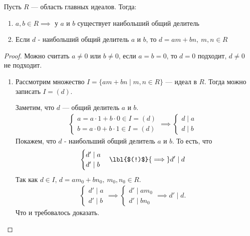 \begin{theorem-non}
    Пусть $R$ --- область главных идеалов. Тогда:

    \begin{enumerate}
        \item $a, b \in R \implies$ у $a$ и $b$ существует наибольший общий делитель
        
        \item Если $d$ - наибольший общий делитель $a$ и $b$, то $d = am + bn,~m, n \in R$
    \end{enumerate}
\end{theorem-non}

\begin{proof}
    
    Можно считать $a \neq 0$ или $b \neq 0$, если $a = b = 0$, то $d = 0$ подходит, $d \neq 0$ не подходит.

    \begin{enumerate}
        \item Рассмотрим множество $I = \{ am + bn \mid m, n \in R \}$ --- идеал в $R$. Тогда можно записать $I = (d)$. 
        
        Заметим, что $d$ --- общий делитель $a$ и $b$. 
        \begin{gather*}
            \begin{cases}
                a = a \cdot 1 + b \cdot 0 \in I = (d)\\
                b = a \cdot 0 + b \cdot 1 \in I = (d)
            \end{cases} \implies \begin{cases}
                d \mid a\\
                d \mid b
            \end{cases}
        \end{gather*}
        Покажем, что $d$ - наибольший общий делитель $a$ и $b$.
        То есть, что 
        \begin{gather*}
            \begin{cases}
                d' \mid a\\
                d' \mid b
            \end{cases} \lbl{$(!)$}{\implies} d' \mid d
        \end{gather*}
        Так как $d \in I$, $d = a m_0 + b n_0,~m_0, n_0 \in R$.
        \begin{gather*}
            \begin{cases}
                d' \mid a\\
                d' \mid b
            \end{cases} \implies \begin{cases}
                d' \mid a m_0\\
                d' \mid b n_0
            \end{cases} \implies d' \mid d.
        \end{gather*}
        Что и требовалось доказать.


\end{enumerate}
\end{proof}
